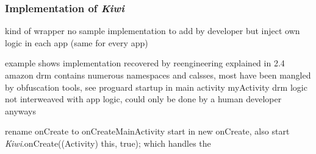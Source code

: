 \subsubsection{Implementation of \textit{Kiwi}} \label{section:license-amazon-implementation}
kind of wrapper
no sample implementation to add by developer but inject own logic in each app (same for every app)

example shows implementation recovered by reengineering explained in 2.4
amazon drm contains numerous namespaces and calsses, most have been mangled by obfuscation tools, see proguard
startup in main activity myActivity
drm logic not interweaved with app logic, could only be done by a human developer anyways

\cite{munteanLicense}
%




rename onCreate to onCreateMainActivity
start in new onCreate, also start \textit{Kiwi}.onCreate((Activity) this, true); which handles the
